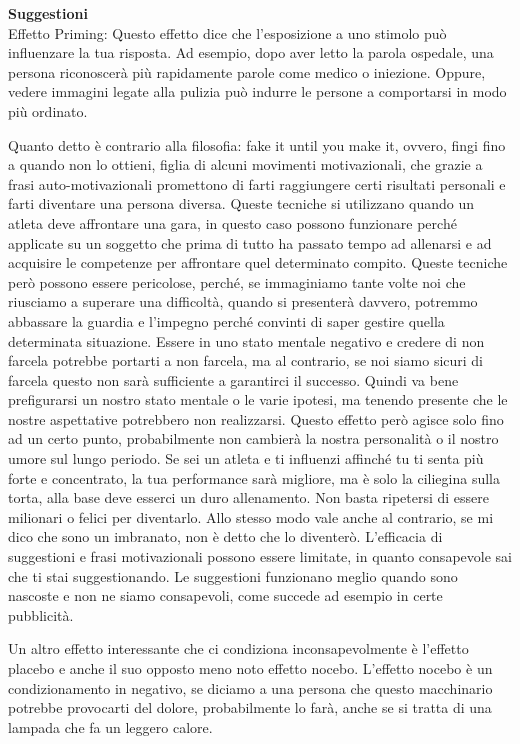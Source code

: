 \documentclass[12pt]{book} %
\begin{document}
\noindent \textbf{\large Suggestioni} \\
Effetto Priming: Questo effetto dice che
l'esposizione a uno stimolo può influenzare la tua risposta.
Ad esempio, dopo aver letto la parola ospedale, una persona riconoscerà più rapidamente parole come medico o iniezione. Oppure, vedere immagini legate alla pulizia può indurre le persone a comportarsi in modo più ordinato.

Quanto detto è contrario alla filosofia: fake it until you make it, ovvero, fingi fino a quando non lo ottieni, figlia
di alcuni movimenti motivazionali, che grazie a frasi auto-motivazionali promettono di farti raggiungere certi risultati
personali e farti diventare una persona diversa. Queste tecniche si
utilizzano quando un atleta deve affrontare una gara, in questo caso possono funzionare perché applicate su un soggetto che prima di tutto ha passato tempo ad allenarsi e ad acquisire le competenze per affrontare quel determinato compito. Queste tecniche però possono essere pericolose, perché, se
immaginiamo tante volte noi che riusciamo a superare una difficoltà, quando si presenterà davvero, potremmo abbassare la
guardia e l'impegno perché convinti di saper gestire quella determinata situazione. Essere in uno
stato mentale negativo e credere di non farcela potrebbe portarti a non farcela, ma al contrario, se noi siamo sicuri di
farcela questo non sarà sufficiente a garantirci il successo. Quindi va bene prefigurarsi un nostro stato mentale o le
varie ipotesi, ma tenendo presente che le nostre aspettative potrebbero non realizzarsi. Questo effetto però
agisce solo fino ad un certo punto, probabilmente non cambierà la nostra personalità o il nostro umore sul lungo periodo. Se sei
un atleta e ti influenzi affinché tu ti senta più forte e concentrato, la tua performance sarà migliore, ma è solo la
ciliegina sulla torta, alla base deve esserci un duro allenamento. Non basta ripetersi di essere milionari o felici
per diventarlo. Allo stesso modo vale anche al contrario, se mi dico che sono un imbranato, non è detto che lo diventerò.
L'efficacia di suggestioni e frasi motivazionali possono essere limitate, in quanto consapevole sai che ti stai suggestionando. Le suggestioni funzionano meglio quando sono nascoste e non ne siamo consapevoli, come succede ad esempio in certe pubblicità. 

Un altro effetto interessante che ci condiziona inconsapevolmente è l'effetto placebo e anche il
suo opposto meno noto effetto nocebo. L'effetto nocebo è un condizionamento in negativo, se
diciamo a una persona che questo macchinario potrebbe provocarti del dolore, probabilmente lo farà, anche se si tratta
di una lampada che fa un leggero calore.
\end{document}
